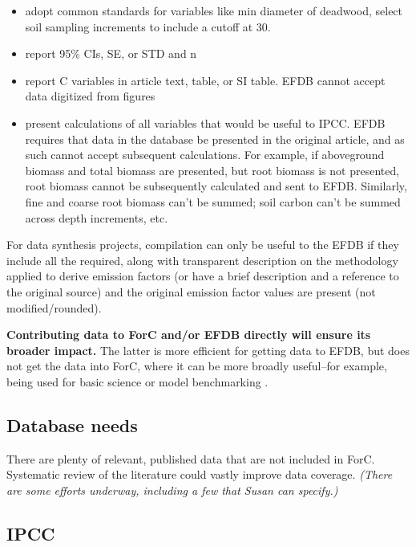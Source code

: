 \documentclass[, manuscript]{copernicus}
\begin{document}
\begin{itemize}
\item
  adopt common standards for variables like min diameter of deadwood,
  select soil sampling increments to include a cutoff at 30.
\item
  report 95\% CIs, SE, or STD and n
\item
  report C variables in article text, table, or SI table. EFDB cannot
  accept data digitized from figures
\item
  present calculations of all variables that would be useful to IPCC.
  EFDB requires that data in the database be presented in the original
  article, and as such cannot accept subsequent calculations. For
  example, if aboveground biomass and total biomass are presented, but
  root biomass is not presented, root biomass cannot be subsequently
  calculated and sent to EFDB. Similarly, fine and coarse root biomass
  can't be summed; soil carbon can't be summed across depth increments,
  etc.
\end{itemize}

For data synthesis projects, compilation can only be useful to the EFDB
if they include all the required, along with transparent description on
the methodology applied to derive emission factors (or have a brief
description and a reference to the original source) and the original
emission factor values are present (not modified/rounded).

\textbf{Contributing data to ForC and/or EFDB directly will ensure its
broader impact.} The latter is more efficient for getting data to EFDB,
but does not get the data into ForC, where it can be more broadly
useful--for example, being used for basic science
\citep[e.g.,][]{banburymorgan_global_2021, anderson-teixeira_carbon_2021}
or model benchmarking \citep{fer_ecosystem_2021}.

\subsection{Database needs}

There are plenty of relevant, published data that are not included in
ForC. Systematic review of the literature could vastly improve data
coverage. \emph{(There are some efforts underway, including a few that
Susan can specify.)}

\subsection{IPCC}
\end{document}
